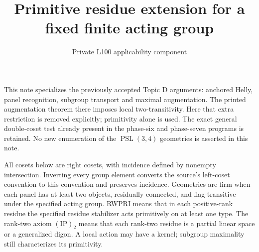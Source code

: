 \documentclass[11pt]{article}
\title{Primitive residue extension for a fixed finite acting group}
\author{Private L100 applicability component}
\date{}
\newcommand{\ip}{\mathrm{(IP)}_2}
\begin{document}
\maketitle
This note specializes the previously accepted Topic D arguments: anchored
Helly, panel recognition, subgroup transport and maximal augmentation.
The printed augmentation theorem there imposes
local two-transitivity. Here that extra restriction is removed explicitly;
primitivity alone is used. The exact general double-coset test already present
in the phase-six and phase-seven programs is retained. No new enumeration of
the $\operatorname{PSL}(3,4)$ geometries is asserted in this note.

All cosets below are right cosets, with incidence defined by nonempty
intersection. Inverting every group element converts the source's left-coset
convention to this convention and preserves incidence. Geometries are firm
when each panel has at least two objects, residually connected, and
flag-transitive under the specified acting group. RWPRI means that in each
positive-rank residue the specified residue stabilizer acts primitively on
at least one type. The rank-two axiom $\ip$ means that each rank-two residue
is a partial linear space or a generalized digon. A local action may have a
kernel; subgroup maximality still characterizes its primitivity.
\end{document}
